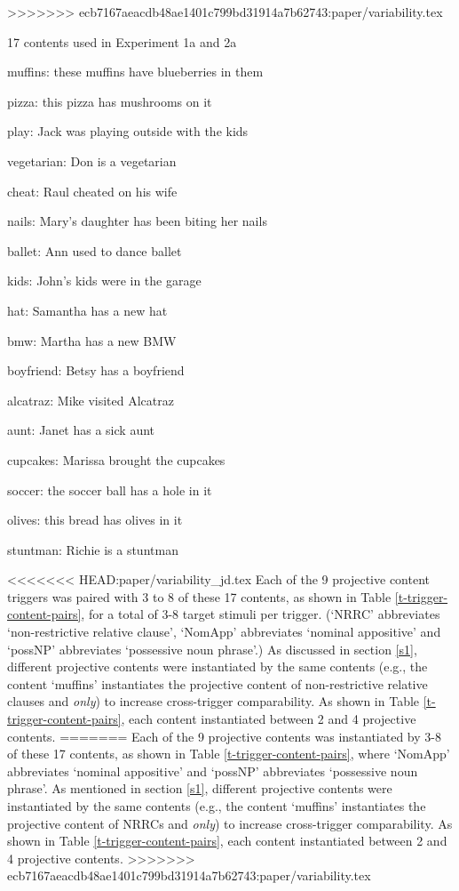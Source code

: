 \documentclass[11pt,fleqn]{article}
\newcommand{\6}{\mbox{$[\hspace*{-.6mm}[$}}
\newcommand{\9}{\mbox{$]\hspace*{-.6mm}]$}}
\begin{document}
>>>>>>> ecb7167aeacdb48ae1401c799bd31914a7b62743:paper/variability.tex

\begin{exe}
\ex\label{contents} 17 contents used in Experiment 1a and 2a

\begin{enumerate}[itemsep=-.5mm]

\ex muffins: these muffins have blueberries in them

\ex pizza: this pizza has mushrooms on it

\ex play: Jack was playing outside with the kids

\ex vegetarian: Don is a vegetarian

\ex cheat: Raul cheated on his wife

\ex nails: Mary's daughter has been biting her nails

\ex ballet: Ann used to dance ballet

\ex kids: John's kids were in the garage

\ex hat: Samantha has a new hat

\ex bmw: Martha has a new BMW

\ex boyfriend: Betsy has a boyfriend

\ex alcatraz: Mike visited Alcatraz

\ex aunt: Janet has a sick aunt

\ex cupcakes: Marissa brought the cupcakes

\ex soccer: the soccer ball has a hole in it

\ex olives: this bread has olives in it

\ex stuntman: Richie is a stuntman

\end{enumerate}
\end{exe}

<<<<<<< HEAD:paper/variability_jd.tex
Each of the 9 projective content triggers was paired with 3 to 8 of these 17 contents, as shown in Table \ref{t-trigger-content-pairs}, for a total of 3-8 target stimuli per trigger. (`NRRC' abbreviates `non-restrictive relative clause', `NomApp' abbreviates `nominal appositive' and `possNP' abbreviates `possessive noun phrase'.) As discussed in section \ref{s1}, different projective contents were instantiated by the same contents (e.g., the content `muffins' instantiates the projective content of non-restrictive relative clauses and {\em only}) to increase cross-trigger comparability. As shown in Table \ref{t-trigger-content-pairs}, each content instantiated between 2 and 4 projective contents.
=======
Each of the 9 projective contents was instantiated by 3-8 of these 17 contents, as shown in Table \ref{t-trigger-content-pairs}, where `NomApp' abbreviates `nominal appositive' and `possNP' abbreviates `possessive noun phrase'. As mentioned in section \ref{s1}, different projective contents were instantiated by the same contents (e.g., the content `muffins' instantiates the projective content of NRRCs and {\em only}) to increase cross-trigger comparability. As shown in Table \ref{t-trigger-content-pairs}, each content instantiated between 2 and 4 projective contents.
>>>>>>> ecb7167aeacdb48ae1401c799bd31914a7b62743:paper/variability.tex
\end{document}
